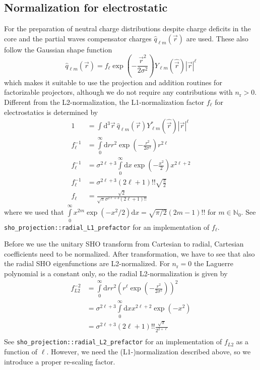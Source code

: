 \documentclass[oribibl]{llncs}
\newcommand{\ttt}[1]{\texttt{#1}}
\newcommand{\nrn}{n_{\mathrm{r}}}
\begin{document}
\subsection{Normalization for electrostatic}
For the preparation of neutral charge distributions despite charge deficits in the core and the partial waves
compensator charges $\hat q_{\ell m}(\vec r)$ are used.
These also follow the Gaussian shape function %
\begin{equation}
 \hat q_{\ell m}(\vec r) = f_{\ell} \exp(-\frac{\vec r^2} {2\sigma^2}) Y_{\ell m}(\hat{\vec r}) |\vec r|^\ell
\end{equation}
which makes it suitable to use the projection and addition routines for factorizable projectors,
although we do not require any contributions with $\nrn > 0$.
Different from the L2-normalization, the L1-normalization factor $f_\ell$ for electrostatics is determined by
\begin{align}
 1 &= \int \mathrm d^3\vec r  \  \hat q_{\ell m}(\vec r) Y^*_{\ell m}(\hat{\vec r}) |\vec r|^\ell \\
 f_\ell^{-1} &= \int\limits_0^\infty \mathrm d r r^2 \exp(-\frac{r^2} {2\sigma^2}) r^{2\ell} \\
 f_\ell^{-1} &= \sigma^{2\ell + 3} \int\limits_0^\infty \mathrm d x \exp(-\frac{x^2}{2}) x^{2\ell + 2} \\
 f_\ell^{-1} &= \sigma^{2\ell + 3} (2\ell + 1)!! \sqrt{\frac{\pi}{2}} \\
 f_\ell &= \frac{\sqrt{2}}{\sqrt{\pi} \sigma^{2\ell + 3} (2\ell + 1)!!}
\end{align}
where we used that $\int\limits_0^{\infty} x^{2m} \exp(-x^2/2) \mathrm dx  = \sqrt{\pi/2} (2m-1)!!$ for $m \in \mathbb N_0$.
See \ttt{sho\_projection::radial\_L1\_prefactor} for an implementation of $f_\ell$.

Before we use the unitary SHO transform from Cartesian to radial,
Cartesian coefficients need to be normalized.
After transformation, we have to see that also the radial SHO eigenfunctions are L2-normalized.
For $\nrn = 0$ the Laguerre polynomial is a constant only, so
the radial L2-normalization is given by
\begin{align}
	f^{-2}_{L2} &= \int\limits_0^\infty \mathrm dr r^2 \left( r^\ell \exp(-\frac{r^2}{2\sigma^2}) \right)^2 \\
				&= \sigma^{2\ell + 3} \int\limits_0^\infty \mathrm dx x^{2\ell + 2} \exp(-x^2) \\
				&= \sigma^{2\ell + 3} (2\ell + 1)!! \frac{\sqrt{\pi}}{2^{2+\ell}} \\
\end{align}
See \ttt{sho\_projection::radial\_L2\_prefactor} for an implementation of $f_{L2}$ as a function of $\ell$.
However, we need the (L1-)normalization described above, so we introduce a proper re-scaling factor.
\end{document}
